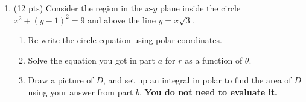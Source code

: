 \documentclass[12 pt]{report}
\begin{document}
\begin{enumerate}
\newpage

\item (12 pts) Consider the region in the $x$-$y$ plane inside the circle $x^2 + (y-1)^2 = 9$ and above the line $y = x \sqrt{3}$. 

\begin{enumerate} \item Re-write the circle equation using polar coordinates. 

\vspace{3cm}

\item Solve the equation you got in part $a$ for $r$ as a function of $\theta$. 

\vspace{5cm} 

\item Draw a picture of $D$, and set up an integral in polar to find the area of $D$ using your answer from part $b$. \textbf{You do not need to evaluate it.} 


\vfill 

\end{enumerate}


\end{enumerate}
\end{document}
